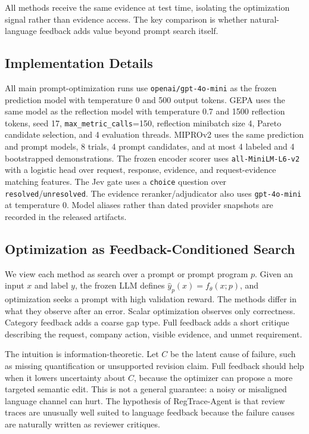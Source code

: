 \documentclass[11pt]{article}
\newcommand{\framework}{RegTrace-Agent}
\begin{document}
All methods receive the same evidence at test time, isolating the optimization signal rather than evidence access. The key comparison is whether natural-language feedback adds value beyond prompt search itself.

\subsection{Implementation Details}

All main prompt-optimization runs use \texttt{openai/gpt-4o-mini} as the frozen prediction model with temperature 0 and 500 output tokens. GEPA uses the same model as the reflection model with temperature 0.7 and 1500 reflection tokens, seed 17, \texttt{max\_metric\_calls}=150, reflection minibatch size 4, Pareto candidate selection, and 4 evaluation threads. MIPROv2 uses the same prediction and prompt models, 8 trials, 4 prompt candidates, and at most 4 labeled and 4 bootstrapped demonstrations. The frozen encoder scorer uses \texttt{all-MiniLM-L6-v2} with a logistic head over request, response, evidence, and request-evidence matching features. The Jev gate uses a \texttt{choice} question over \texttt{resolved}/\texttt{unresolved}. The evidence reranker/adjudicator also uses \texttt{gpt-4o-mini} at temperature 0. Model aliases rather than dated provider snapshots are recorded in the released artifacts.

\subsection{Optimization as Feedback-Conditioned Search}

We view each method as search over a prompt or prompt program $p$. Given an input $x$ and label $y$, the frozen LLM defines $\hat{y}_{p}(x)=f_{\theta}(x;p)$, and optimization seeks a prompt with high validation reward. The methods differ in what they observe after an error. Scalar optimization observes only correctness. Category feedback adds a coarse gap type. Full feedback adds a short critique describing the request, company action, visible evidence, and unmet requirement.

The intuition is information-theoretic. Let $C$ be the latent cause of failure, such as missing quantification or unsupported revision claim. Full feedback should help when it lowers uncertainty about $C$, because the optimizer can propose a more targeted semantic edit. This is not a general guarantee: a noisy or misaligned language channel can hurt. The hypothesis of \framework{} is that review traces are unusually well suited to language feedback because the failure causes are naturally written as reviewer critiques.
\end{document}
